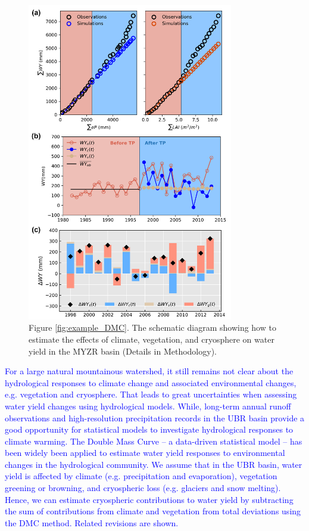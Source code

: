 \documentclass[11pt]{article}
\newcommand{\nextreply}[1]{\bigskip \textcolor{blue}{\noindent #1}}
\begin{document}
\begin{figure}[ht]
    \centering
    \includegraphics[width=9cm]{02-figures/example_DMC.png}
    \captionsetup{labelformat=empty}
    \caption
    {Figure \ref{fig:example_DMC}. The schematic diagram showing how to estimate the effects of climate, vegetation, and cryosphere on water yield in the MYZR basin (Details in Methodology).}
\end{figure}

\nextreply{For a large natural mountainous watershed, it still remains not clear about the hydrological responses to climate change and associated environmental changes, e.g. vegetation and cryosphere. That leads to great uncertainties when assessing water yield changes using hydrological models. While, long-term annual runoff observations and high-resolution precipitation records in the UBR basin provide a good opportunity for statistical models to investigate hydrological responses to climate warming. The Double Mass Curve -- a data-driven statistical model -- has been widely been applied to estimate water yield responses to environmental changes in the hydrological community.
We assume that in the UBR basin, water yield is affected by climate (e.g. precipitation and evaporation), vegetation greening or browning, and cryospheric loss (e.g. glaciers and snow melting). Hence, we can estimate cryospheric contributions to water yield by subtracting the sum of contributions from climate and vegetation from total deviations using the DMC method. Related revisions are shown.}
\end{document}
